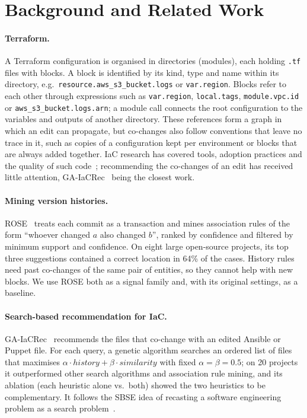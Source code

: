 \section{Background and Related Work}
\label{sec:background}

\paragraph{Terraform.} A Terraform configuration is organised in directories (modules), each holding
\texttt{.tf} files with blocks. A block is identified by its kind, type and name within its
directory, e.g.\ \texttt{resource.aws\_s3\_bucket.logs} or \texttt{var.region}. Blocks refer to
each other through expressions such as \texttt{var.region}, \texttt{local.tags},
\texttt{module.vpc.id} or \texttt{aws\_s3\_bucket.logs.arn}; a module call connects the root
configuration to the variables and outputs of another directory. These references form a graph in
which an edit can propagate, but co-changes also follow conventions that leave no trace in it, such
as copies of a configuration kept per environment or blocks that are always added together. IaC
research has covered tools, adoption practices and the quality of such
code~\cite{rahman2019iacmapping}; recommending the co-changes of an edit has received little
attention, GA-IaCRec~\cite{bessghaier2026iacrec} being the closest work.

\paragraph{Mining version histories.} ROSE~\cite{zimmermann2004rose} treats each commit as a
transaction and mines association rules of the form ``whoever changed $a$ also changed $b$'',
ranked by confidence and filtered by minimum support and confidence. On eight large open-source
projects, its top three suggestions contained a correct location in 64\% of the cases. History rules
need past co-changes of the same pair of entities, so they cannot help with new blocks. We use ROSE
both as a signal family and, with its original settings, as a baseline.

\paragraph{Search-based recommendation for IaC.} GA-IaCRec~\cite{bessghaier2026iacrec} recommends
the files that co-change with an edited Ansible or Puppet file. For each query, a genetic algorithm
searches an ordered list of files that maximises $\alpha \cdot \mathit{history} + \beta \cdot
\mathit{similarity}$ with fixed $\alpha = \beta = 0.5$; on 20 projects it outperformed other search algorithms and
association rule mining, and its ablation (each heuristic alone vs.\ both) showed
the two heuristics to be complementary. It follows the SBSE idea of recasting a software engineering
problem as a search problem~\cite{harman2001sbse}.

